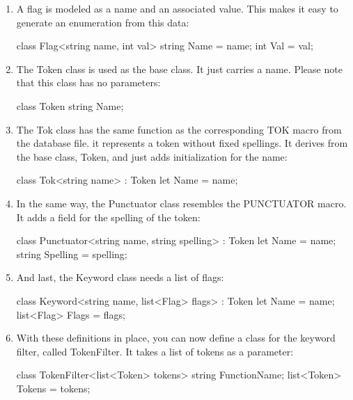 \begin{enumerate}
\item
A flag is modeled as a name and an associated value. This makes it easy to generate an enumeration from this data:

\begin{shell}
class Flag<string name, int val> {
    string Name = name;
    int Val = val;
}
\end{shell}

\item
The Token class is used as the base class. It just carries a name. Please note that this class has no parameters:

\begin{shell}
class Token {
    string Name;
}
\end{shell}

\item
The Tok class has the same function as the corresponding TOK macro from the database file. it represents a token without fixed spellings. It derives from the base class, Token, and just adds initialization for the name:

\begin{shell}
class Tok<string name> : Token {
    let Name = name;
}
\end{shell}

\item
In the same way, the Punctuator class resembles the PUNCTUATOR macro. It adds a field for the spelling of the token:

\begin{shell}
class Punctuator<string name, string spelling> : Token {
    let Name = name;
    string Spelling = spelling;
}
\end{shell}

\item
And last, the Keyword class needs a list of flags:

\begin{shell}
class Keyword<string name, list<Flag> flags> : Token {
    let Name = name;
    list<Flag> Flags = flags;
}
\end{shell}

\item
With these definitions in place, you can now define a class for the keyword filter, called TokenFilter. It takes a list of tokens as a parameter:

\begin{shell}
class TokenFilter<list<Token> tokens> {
    string FunctionName;
    list<Token> Tokens = tokens;
}
\end{shell}
\end{enumerate}

